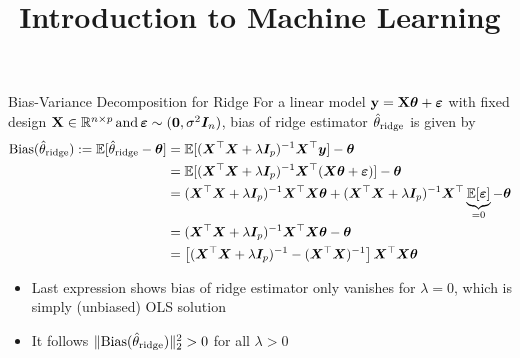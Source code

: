 \documentclass[11pt,compress,t,notes=noshow, xcolor=table]{beamer}
\title{Introduction to Machine Learning}
\begin{document}



\begin{vbframe}{Bias-Variance Decomposition for Ridge}
For a linear model $\mathbf{y} = \mathbf{X} \bm{\theta} + \bm{\varepsilon}$ with fixed design $\mathbf{X} \in \mathbb{R}^{n \times p}\,\text{and}\,\bm{\varepsilon} \sim (\bm{0},\sigma^2 \bm{I}_n)$, bias of ridge estimator $\hat{\theta}_{\text{ridge}}$ is given by 
\begin{equation*}
    \begin{aligned}
        \text{Bias}(\hat{\theta}_{\text{ridge}}) := \mathbb{E}[\hat{\theta}_{\text{ridge}}-\bm{\theta}] &= \mathbb{E}[(\bm{X}^{\top}\bm{X} +\lambda\bm{I}_p )^{-1} \bm{X}^{\top}\bm{y}] - \bm{\theta}\\
        &= \mathbb{E}[(\bm{X}^{\top}\bm{X} +\lambda\bm{I}_p )^{-1} \bm{X}^{\top}(\bm{X}\bm{\theta}+\bm{\varepsilon})] - \bm{\theta} \\
        &= (\bm{X}^{\top}\bm{X} +\lambda\bm{I}_p )^{-1} \bm{X}^{\top} \bm{X} \bm{\theta} + (\bm{X}^{\top}\bm{X} +\lambda\bm{I}_p )^{-1} \bm{X}^{\top} \underbrace{\mathbb{E}[\bm{\varepsilon}]}_{=0} - \bm{\theta} \\
        &= (\bm{X}^{\top}\bm{X} +\lambda\bm{I}_p )^{-1} \bm{X}^{\top} \bm{X} \bm{\theta} - \bm{\theta} \\
        &= \left[(\bm{X}^{\top}\bm{X} +\lambda\bm{I}_p )^{-1} - (\bm{X}^{\top} \bm{X})^{-1} \right] \bm{X}^{\top} \bm{X} \bm{\theta}
        \end{aligned}
    \end{equation*}

\begin{itemize}
    \item Last expression shows bias of ridge estimator only vanishes for $\lambda=0$, which is simply (unbiased) OLS solution
    \item It follows $\Vert \text{Bias}(\hat{\theta}_{\text{ridge}})\Vert_2^2>0$ for all $\lambda>0$
\end{itemize}


\end{vbframe}
\end{document}
